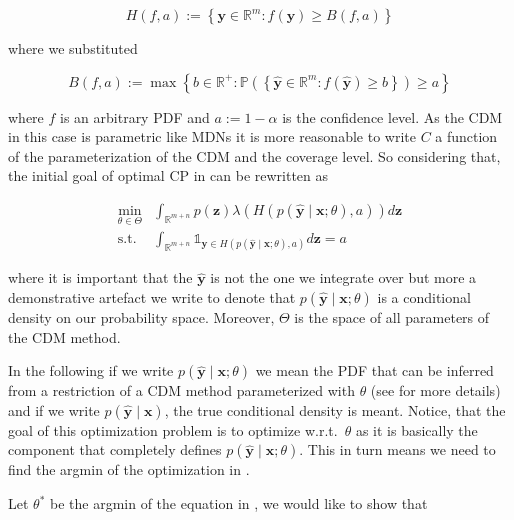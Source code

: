 \begin{equation}
    H\left(f, a\right):=\left\{\mathbf{y} \in \mathbb{R}^m: f(\mathbf{y}) \geq
    B(f, a)\right\}
    \label{eq:HDR}
\end{equation}

where we substituted

\begin{equation}\label{eq:HDR_b}
    B(f, a):=\max \left\{b \in \mathbb{R^+}: \mathbb{P}\left(\left\{\mathbf{\hat{y}}
    \in
    \mathbb{R}^m: f(\mathbf{\hat{y}}) \geq b\right\}\right) \geq a
    \right\}
\end{equation}

where $f$ is an arbitrary PDF and $a := 1 - \alpha$ is the confidence level. As the CDM in this case is parametric like MDNs it is more reasonable to write $C$ a function of the parameterization of the CDM and the coverage level. So considering that, the initial goal of optimal CP in  can be rewritten as


\begin{align}
    \min_{\theta \in \Theta} & \int_{\mathbb{R}^{m+n}} p(\mathbf{z})
    \lambda\left(H\left(p(\mathbf{\hat{y}} \mid \mathbf{x}; \theta), a\right)\right)
    d\mathbf{z}
    \label{eq:optimal_cp_obj_func} \\
    \text{s.t.} & \int_{\mathbb{R}^{m+n}}
    \mathds{1}_{\mathbf{y} \in H(p(\mathbf{\hat{y}} \mid \mathbf{x}; \theta), a)}
    d\mathbf{z} = a
\end{align}


where it is important that the $\mathbf{\hat{y}}$ is not the one we integrate over but more a demonstrative artefact we write to denote that $p(\mathbf{\hat{y}} \mid \mathbf{x}; \theta)$ is a conditional density on our probability space. Moreover, $\Theta$ is the space of all parameters of the CDM method.

In the following if we write $p(\mathbf{\hat{y}} \mid \mathbf{x}; \theta)$ we mean the PDF that can be inferred from a restriction of a CDM method parameterized with $\theta$ (see  for more details) and if we write $p(\mathbf{\hat{y}} \mid \mathbf{x})$, the true conditional density is meant. Notice, that the goal of this optimization problem is to optimize w.r.t.\ $\theta$ as it is basically the component that completely defines $p(\mathbf{\hat{y}} \mid \mathbf{x}; \theta)$. This in turn means we need to find the argmin of the optimization in .

Let $\theta^*$ be the argmin of the equation in , we would like to show that

